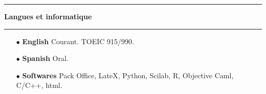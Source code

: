\documentclass[a4paper,11pt]{article}
\newcommand{\titre}[1]{%
	\begin{center}
	\bigskip
	\rule{\textwidth}{1pt}
	\par\vspace{0.1cm}
        \textbf{\large #1}
	\par\rule{\textwidth}{1pt}
	\end{center}
	\bigskip
	}
\begin{document}
\titre{Langues et informatique}

\begin{itemize} 
\medskip
\item[$\bullet$] \textbf{English} Courant. TOEIC 915/990.
\medskip
\item[$\bullet$] \textbf{Spanish} Oral.
\medskip
\item[$\bullet$] \textbf{Softwares} Pack Office, LateX, Python, Scilab, R, Objective Caml, C/C++, html.
\end{itemize}
\end{document}
